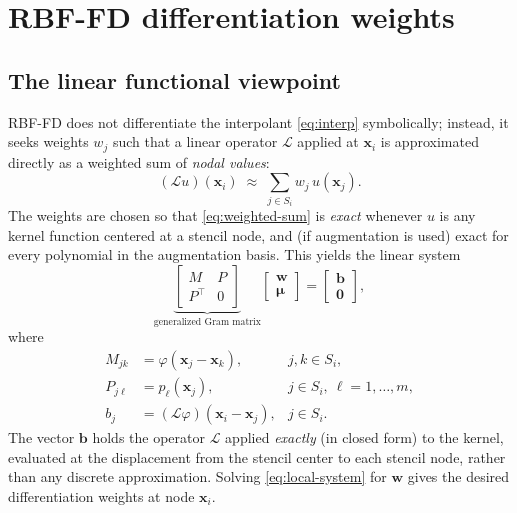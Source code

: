 \documentclass[11pt]{article}
\newcommand{\bx}{\mathbf{x}}
\newcommand{\bw}{\mathbf{w}}
\begin{document}
\section{RBF-FD differentiation weights}

\subsection{The linear functional viewpoint}

RBF-FD does not differentiate the interpolant \eqref{eq:interp}
symbolically; instead, it seeks weights $w_j$ such that a linear
operator $\mathcal{L}$ applied at $\bx_i$ is approximated directly as a
weighted sum of \emph{nodal values}:
\begin{equation}
  (\mathcal{L}u)(\bx_i) \;\approx\; \sum_{j \in S_i} w_j\, u(\bx_j).
  \label{eq:weighted-sum}
\end{equation}
The weights are chosen so that \eqref{eq:weighted-sum} is \emph{exact}
whenever $u$ is any kernel function centered at a stencil node, and
(if augmentation is used) exact for every polynomial in the
augmentation basis. This yields the linear system
\begin{equation}
  \underbrace{
  \begin{bmatrix} M & P \\ P^\top & 0 \end{bmatrix}
  }_{\text{generalized Gram matrix}}
  \begin{bmatrix} \bw \\ \boldsymbol{\mu} \end{bmatrix}
  =
  \begin{bmatrix} \mathbf{b} \\ \mathbf{0} \end{bmatrix},
  \label{eq:local-system}
\end{equation}
where
\begin{align}
  M_{jk} &= \varphi(\bx_{j} - \bx_{k}), &j,k \in S_i, \\
  P_{j\ell} &= p_\ell(\bx_j), &j \in S_i,\ \ell=1,\dots,m, \\
  b_j &= (\mathcal{L}\varphi)(\bx_i - \bx_j), &j \in S_i.
  \label{eq:local-system-entries}
\end{align}
The vector $\mathbf{b}$ holds the operator $\mathcal{L}$ applied
\emph{exactly} (in closed form) to the kernel, evaluated at the
displacement from the stencil center to each stencil node, rather than
any discrete approximation. Solving \eqref{eq:local-system} for $\bw$
gives the desired differentiation weights at node $\bx_i$.
\end{document}

